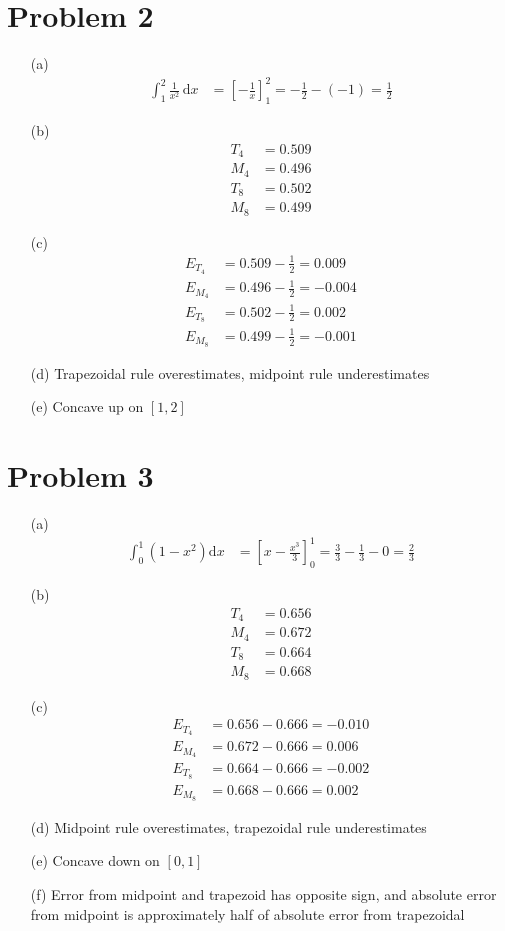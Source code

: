 \documentclass[preview, margin=0.6in]{standalone}
\newcommand*{\problem}[1]{\section*{Problem #1}}
\begin{document}
\problem{2}
\begin{itemize}
	\item[(a)]
		\begin{align*}
		    \int_{1}^{2}\frac{1}{x^2}\,\mathrm{d}x
			&=\left[-\frac{1}{x}\right]_{1}^{2}
			=-\frac{1}{2}-(-1)
			=\frac{1}{2}
		\end{align*}
	\item[(b)]
		\begin{align*}
			T_4&=0.509 \\
			M_4&=0.496 \\
			T_8&=0.502 \\
			M_8&=0.499
		\end{align*}
	\item[(c)]
		\begin{align*}
			E_{T_4}&=0.509-\frac{1}{2}=0.009 \\
			E_{M_4}&=0.496-\frac{1}{2}=-0.004 \\
			E_{T_8}&=0.502-\frac{1}{2}=0.002 \\
			E_{M_8}&=0.499-\frac{1}{2}=-0.001
		\end{align*}
	\item[(d)] Trapezoidal rule overestimates, midpoint rule underestimates
	\item[(e)] Concave up on $[1,2]$
\end{itemize}

\problem{3}
\begin{itemize}
	\item[(a)]
		\begin{align*}
		    \int_{0}^{1}\left(1-x^2\right)\mathrm{d}x
			&=\left[x-\frac{x^3}{3}\right]_{0}^{1}
			=\frac{3}{3}-\frac{1}{3}-0
			=\frac{2}{3}
		\end{align*}
	\item[(b)]
		\begin{align*}
			T_4&=0.656 \\
			M_4&=0.672 \\
			T_8&=0.664 \\
			M_8&=0.668
		\end{align*}
	\item[(c)]
		\begin{align*}
			E_{T_4}&=0.656-0.666=-0.010 \\
			E_{M_4}&=0.672-0.666=0.006 \\
			E_{T_8}&=0.664-0.666=-0.002 \\
			E_{M_8}&=0.668-0.666=0.002
		\end{align*}
	\item[(d)]Midpoint rule overestimates, trapezoidal rule underestimates
	\item[(e)] Concave down on $[0,1]$
	\item[(f)] Error from midpoint and trapezoid has opposite sign, and absolute error from midpoint is approximately half of absolute error from trapezoidal
\end{itemize}
\end{document}
